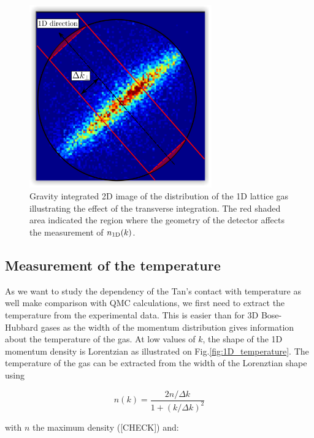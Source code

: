 \begin{figure}
    \centering
    \includegraphics[width=0.7\textwidth]{Fig/Chapter5/1D_transverse_integration.png}
    \caption{Gravity integrated 2D image of the distribution of the 1D lattice gas illustrating the effect of the transverse integration. The red shaded area indicated the region where the geometry of the detector affects the measurement of $n_{\rm{1D}} (k)$.}
    \label{fig:1D_integration}
\end{figure}

\subsection{Measurement of the temperature}

\label{sec:1D_temperature}

As we want to study the dependency of the Tan's contact with temperature as well make comparison with QMC calculations, we first need to extract the temperature from the experimental data. This is easier than for 3D Bose-Hubbard gases as the width of the momentum distribution gives information about the temperature of the gas. At low values of $k$, the shape of the 1D momentum density is Lorentzian as illustrated on Fig.\ref{fig:1D_temperature}.  The temperature of the gas can be extracted from the width of the Lorenztian shape using 

\begin{equation}
    n(k)=\frac{2n/\Delta k }{1+(k/\Delta k)^2}
\end{equation}

\noindent with $n$ the maximum density ({\color{blue}[CHECK]}) and:

